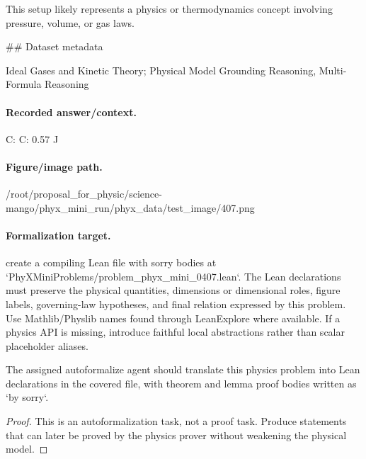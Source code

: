 This setup likely represents a physics or thermodynamics concept involving pressure, volume, or gas laws.

\#\# Dataset metadata

Ideal Gases and Kinetic Theory; Physical Model Grounding Reasoning, Multi-Formula Reasoning

\paragraph{Recorded answer/context.}
C: C: 0.57 J

\paragraph{Figure/image path.}
/root/proposal\_for\_physic/science-mango/phyx\_mini\_run/phyx\_data/test\_image/407.png

\paragraph{Formalization target.}
create a compiling Lean file with sorry bodies at `PhyXMiniProblems/problem\_phyx\_mini\_0407.lean`. The Lean declarations must preserve the physical quantities, dimensions or dimensional roles, figure labels, governing-law hypotheses, and final relation expressed by this problem.
Use Mathlib/Physlib names found through LeanExplore where available. If a physics API is missing, introduce faithful local abstractions rather than scalar placeholder aliases.

\begin{theorem}
\label{thm:physics:phyx_mini_0407:target}
The assigned autoformalize agent should translate this physics problem into Lean declarations in the covered file, with theorem and lemma proof bodies written as `by sorry`.
\end{theorem}
\begin{proof}
This is an autoformalization task, not a proof task. Produce statements that can later be proved by the physics prover without weakening the physical model.
\end{proof}

